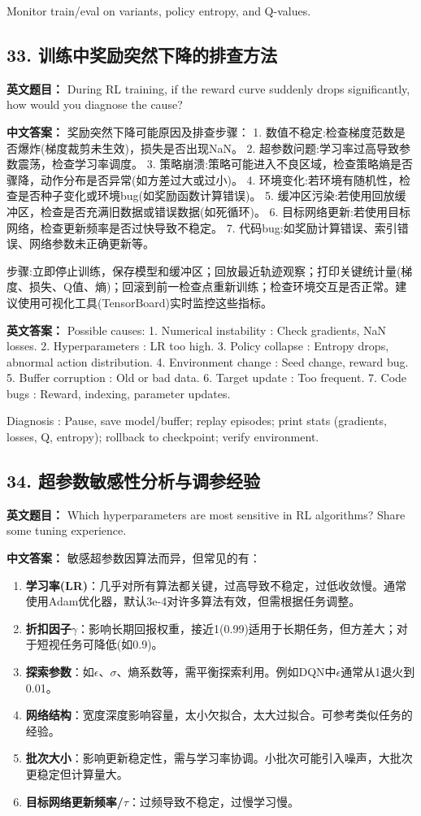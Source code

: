 \documentclass[10pt,a4paper]{ctexart}
\begin{document}
Monitor train/eval on variants, policy entropy, and Q-values.

\subsection*{33. 训练中奖励突然下降的排查方法}
\textbf{英文题目：} During RL training, if the reward curve suddenly drops significantly, how would you diagnose the cause?

\textbf{中文答案：}  
奖励突然下降可能原因及排查步骤：
1.  数值不稳定:检查梯度范数是否爆炸(梯度裁剪未生效)，损失是否出现NaN。
2.  超参数问题:学习率过高导致参数震荡，检查学习率调度。
3.  策略崩溃:策略可能进入不良区域，检查策略熵是否骤降，动作分布是否异常(如方差过大或过小)。
4.  环境变化:若环境有随机性，检查是否种子变化或环境bug(如奖励函数计算错误)。
5.  缓冲区污染:若使用回放缓冲区，检查是否充满旧数据或错误数据(如死循环)。
6.  目标网络更新:若使用目标网络，检查更新频率是否过快导致不稳定。
7.  代码bug:如奖励计算错误、索引错误、网络参数未正确更新等。

 步骤:立即停止训练，保存模型和缓冲区；回放最近轨迹观察；打印关键统计量(梯度、损失、Q值、熵)；回滚到前一检查点重新训练；检查环境交互是否正常。建议使用可视化工具(TensorBoard)实时监控这些指标。

\textbf{英文答案：}  
Possible causes:
1.  Numerical instability : Check gradients, NaN losses.
2.  Hyperparameters : LR too high.
3.  Policy collapse : Entropy drops, abnormal action distribution.
4.  Environment change : Seed change, reward bug.
5.  Buffer corruption : Old or bad data.
6.  Target update : Too frequent.
7.  Code bugs : Reward, indexing, parameter updates.

 Diagnosis : Pause, save model/buffer; replay episodes; print stats (gradients, losses, Q, entropy); rollback to checkpoint; verify environment.

\subsection*{34. 超参数敏感性分析与调参经验}
\textbf{英文题目：} Which hyperparameters are most sensitive in RL algorithms? Share some tuning experience.

\textbf{中文答案：}  
敏感超参数因算法而异，但常见的有：
\begin{enumerate}
    \item \textbf{学习率(LR)}：几乎对所有算法都关键，过高导致不稳定，过低收敛慢。通常使用Adam优化器，默认3e-4对许多算法有效，但需根据任务调整。
    \item \textbf{折扣因子\(\gamma\)}：影响长期回报权重，接近1(0.99)适用于长期任务，但方差大；对于短视任务可降低(如0.9)。
    \item \textbf{探索参数}：如\(\epsilon\)、\(\sigma\)、熵系数等，需平衡探索利用。例如DQN中\(\epsilon\)通常从1退火到0.01。
    \item \textbf{网络结构}：宽度深度影响容量，太小欠拟合，太大过拟合。可参考类似任务的经验。
    \item \textbf{批次大小}：影响更新稳定性，需与学习率协调。小批次可能引入噪声，大批次更稳定但计算量大。
    \item \textbf{目标网络更新频率/\(\tau\)}：过频导致不稳定，过慢学习慢。
\end{enumerate}
\end{document}
